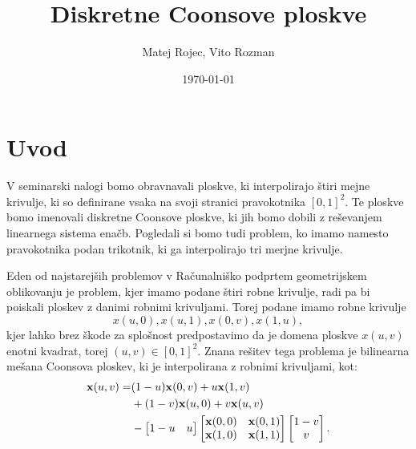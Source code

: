 \documentclass[a4paper,12pt]{article}
\begin{document}
\newcommand{\N}{\mathbb{N}}
\newcommand{\R}{\mathbb{R}}
\newcommand\sbullet[1][.5]{\mathbin{\vcenter{\hbox{\scalebox{#1}{$\bullet$}}}}}
\newtheorem{definicija}{Definicija}[section]
\newtheorem{primer}[definicija]{Primer}
\newtheorem{opomba}[definicija]{Opomba}

\title{Diskretne Coonsove ploskve}
\author{Matej Rojec, Vito Rozman}
\date{\today}

\maketitle

\newpage

\tableofcontents
\listoffigures

\newpage

\section{Uvod}

V seminarski nalogi bomo obravnavali ploskve, ki interpolirajo štiri mejne krivulje,
ki so definirane vsaka na svoji stranici pravokotnika $[0,1]^2$. 
Te ploskve bomo imenovali diskretne Coonsove ploskve, 
ki jih bomo dobili z reševanjem linearnega sistema enačb.
Pogledali si bomo tudi problem, ko imamo namesto pravokotnika podan 
trikotnik, ki ga interpolirajo tri merjne krivulje.

Eden od najstarejših problemov v Računalniško podprtem geometrijskem oblikovanju je problem, 
kjer imamo podane štiri robne krivulje, radi pa bi poiskali ploskev z danimi robnimi krivuljami. 
Torej podane imamo robne krivulje $$x(u,0), x(u,1), x(0,v),  x(1,u),$$ kjer lahko brez škode za 
splošnost predpostavimo da je domena ploskve $x(u,v)$ enotni kvadrat, torej $(u,v) \in [0,1]^2$. 
Znana rešitev tega problema je bilinearna mešana Coonsova ploskev, ki je interpolirana z robnimi 
krivuljami, kot:
\begin{align}
   \label{continiusCons}
   \mathbf{x}(u,v) =& (1-u)\mathbf{x}(0,v) +u\mathbf{x}(1,v) \notag \\
    & + (1-v)\mathbf{x}(u,0) +v\mathbf{x}(u,v)   \\
   & - 
   \begin{bmatrix} 
      1-u & u 
   \end{bmatrix}
   \begin{bmatrix} 
      \mathbf{x}(0,0)& \mathbf{x}(0,1) \notag \\
      \mathbf{x}(1,0)& \mathbf{x}(1,1) 
   \end{bmatrix}
   \begin{bmatrix}
      1-v\\
      v
   \end{bmatrix}.
\end{align}
\end{document}
